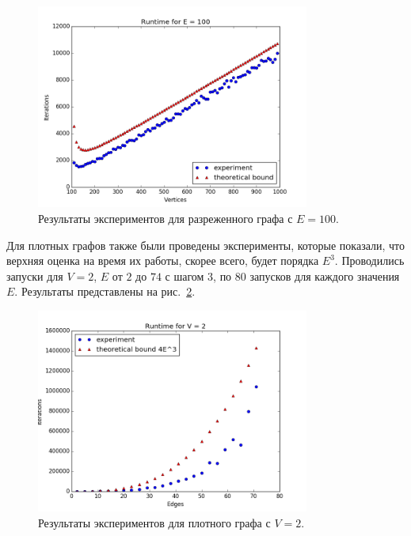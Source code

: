 \documentclass{spisok-article}
\begin{document}
\begin{figure}[h]
\begin{center}
\includegraphics[width=0.8\textwidth]{pic/rarefied_graph.png}
\end{center}
\caption{Результаты экспериментов для разреженного графа с $E = 100$.}\label{rarefied_graph}
\end{figure}

Для плотных графов также были проведены эксперименты, которые показали, что верхняя оценка на время их работы, скорее всего, будет порядка $E^3$. Проводились запуски для $V = 2$, $E$ от $2$ до $74$ с шагом $3$, по $80$ запусков для каждого значения $E$. Результаты представлены на рис.~\ref{dense_graph}.


\begin{figure}[h]
\begin{center}
\includegraphics[width=0.8\textwidth]{pic/dense_graph.png}
\end{center}
\caption{Результаты экспериментов для плотного графа с $V = 2$.}\label{dense_graph}
\end{figure}
\end{document}
